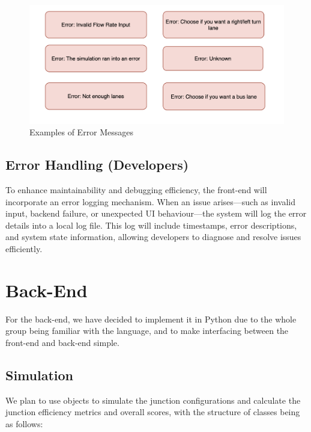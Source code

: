 \documentclass{article}
\begin{document}
\begin{figure}[H]
    \centering
    \includegraphics[width=\textwidth]{errormsg.png}
    \caption{Examples of Error Messages}
    \label{errormsg}
\end{figure}

\subsection{Error Handling (Developers)}
To enhance maintainability and debugging efficiency, the front-end will incorporate an error
logging mechanism. When an issue arises—such as invalid input, backend failure, or
unexpected UI behaviour—the system will log the error details into a local log file. This log
will include timestamps, error descriptions, and system state information, allowing
developers to diagnose and resolve issues efficiently.

\section{Back-End}
For the back-end, we have decided to implement it in Python due to the whole group being familiar with the language, and to make 
interfacing between the front-end and back-end simple. 

\subsection{Simulation}

We plan to use objects to simulate the junction configurations and calculate 
the junction efficiency metrics and overall scores, with the structure of classes being as follows:
\end{document}
